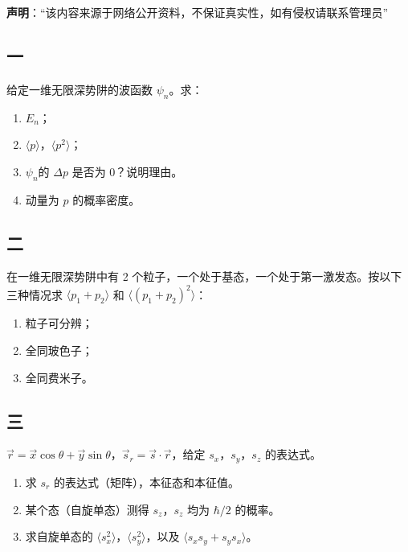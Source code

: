 
\textbf{声明}：“该内容来源于网络公开资料，不保证真实性，如有侵权请联系管理员”

\subsection{一}
给定一维无限深势阱的波函数 $\psi_n$。求：
\begin{enumerate}
    \item $E_n$；
    \item $\langle p \rangle$，$\langle p^2 \rangle$；
    \item $\psi_n$的 $\Delta p$ 是否为 0？说明理由。
    \item 动量为 $p$ 的概率密度。
\end{enumerate}
\subsection{二}
在一维无限深势阱中有 2 个粒子，一个处于基态，一个处于第一激发态。按以下三种情况求 $\langle p_1 + p_2 \rangle$ 和 $\langle (p_1 + p_2)^2 \rangle$：
\begin{enumerate}
    \item 粒子可分辨；
    \item 全同玻色子；
    \item 全同费米子。
\end{enumerate}
\subsection{三}
$\vec{r} = \vec{x} \cos \theta + \vec{y} \sin \theta$，$\vec s_r = \vec{s} \cdot \vec{r}$，给定 $s_x$，$s_y$，$s_z$ 的表达式。
\begin{enumerate}
    \item 求 $s_r$ 的表达式（矩阵），本征态和本征值。
    \item 某个态（自旋单态）测得 $s_z$，$s_z$ 均为 $\hbar/2$ 的概率。
    \item 求自旋单态的 $\langle s_x^2 \rangle$，$\langle s_y^2 \rangle$，以及 $\langle s_x s_y + s_y s_x \rangle$。
\end{enumerate}
